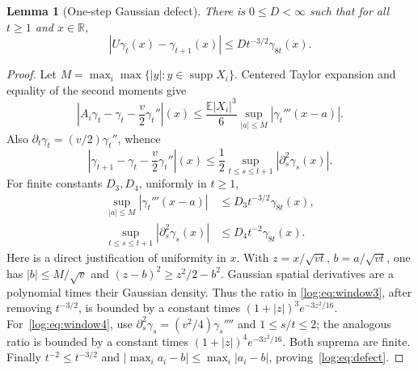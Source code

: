 \documentclass[11pt,a4paper]{article}
\newtheorem{lemma}[theorem]{Lemma}
\theoremstyle{definition}\newtheorem{definition}[theorem]{Definition}
\theoremstyle{remark}\newtheorem{remark}[theorem]{Remark}
\newcommand{\E}{\mathbb E}
\newcommand{\R}{\mathbb R}
\numberwithin{equation}{section}
\begin{document}
\begin{lemma}[One-step Gaussian defect]\label{log:lem:defect}
There is $0\le D<\infty$ such that for all $t\ge1$ and $x\in\R$,
\begin{equation}\label{log:eq:defect}
 |U\gamma_t(x)-\gamma_{t+1}(x)|
 \le D t^{-3/2}\gamma_{8t}(x).
\end{equation}
\end{lemma}
\begin{proof}
Let $M=\max_i\max\{|y|:y\in\operatorname{supp}X_i\}$.
Centered Taylor expansion and equality of the second moments give
\[
 \left|A_i\gamma_t-\gamma_t-\frac v2\gamma_t''\right|(x)
 \le\frac{\E|X_i|^3}{6}
       \sup_{|a|\le M}|\gamma_t'''(x-a)|.
\]
Also $\partial_t\gamma_t=(v/2)\gamma_t''$, whence
\[
 \left|\gamma_{t+1}-\gamma_t-\frac v2\gamma_t''\right|(x)
 \le\frac12\sup_{t\le s\le t+1}|\partial_s^2\gamma_s(x)|.
\]
For finite constants $D_3,D_4$, uniformly in $t\ge1$,
\begin{align}
 \sup_{|a|\le M}|\gamma_t'''(x-a)|
    &\le D_3t^{-3/2}\gamma_{8t}(x),\label{log:eq:window3}\\
 \sup_{t\le s\le t+1}|\partial_s^2\gamma_s(x)|
    &\le D_4t^{-2}\gamma_{8t}(x).\label{log:eq:window4}
\end{align}
Here is a direct justification of uniformity in $x$. With
$z=x/\sqrt{vt}$, $b=a/\sqrt{vt}$, one has $|b|\le M/\sqrt v$
and $(z-b)^2\ge z^2/2-b^2$. Gaussian spatial derivatives are a
polynomial times their Gaussian density. Thus the ratio in
\eqref{log:eq:window3}, after removing $t^{-3/2}$, is bounded by a
constant times $(1+|z|)^3e^{-3z^2/16}$. For~\eqref{log:eq:window4},
use $\partial_s^2\gamma_s=(v^2/4)\gamma_s''''$ and
$1\le s/t\le2$; the analogous ratio is bounded by a constant times
$(1+|z|)^4e^{-3z^2/16}$. Both suprema are finite.
Finally $t^{-2}\le t^{-3/2}$ and
$|\max_i a_i-b|\le\max_i|a_i-b|$, proving~\eqref{log:eq:defect}.
\end{proof}
\end{document}
